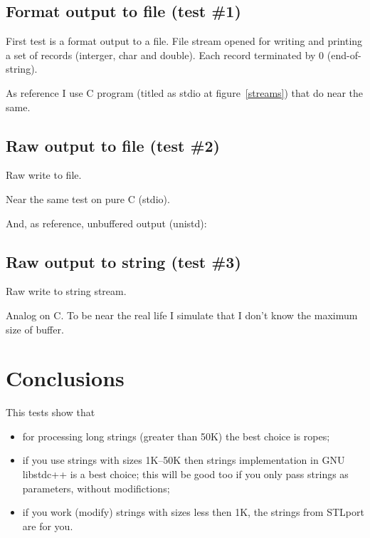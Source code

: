 \documentclass[a4paper]{article}
\providecommand{\STLport}{{\fontfamily{cmss}\selectfont STLport}}
\providecommand{\libstd}{{\fontfamily{cmtt}\selectfont GNU \mbox{libstdc++}}}
\begin{document}
\subsection{Format output to file\label{fstream-format} (test \#1)}

First test is a format output to a file. File stream opened for writing
and printing a set of records (interger, char and double). Each record
terminated by 0 (end-of-string).



As reference I use C program (titled as stdio at figure~\ref{streams}) that
do near the same.



\subsection{Raw output to file\label{fstream-raw} (test \#2)}

Raw write to file.



Near the same test on pure C (stdio).



And, as reference, unbuffered output (unistd):



\subsection{Raw output to string\label{sstream-raw} (test \#3)}

Raw write to string stream.



Analog on C. To be near the real life I simulate that I don't know
the maximum size of buffer.



\section{Conclusions}

This tests show that
\begin{itemize}
  \item for processing long strings (greater than 50K) the best choice is
        ropes;
  \item if you use strings with sizes 1K--50K then strings implementation in 
        \libstd{} is a best choice; this will be good too if you only pass
        strings as parameters, without modifictions;
  \item if you work (modify) strings with sizes less then 1K,
        the strings from \STLport{} are for you.
\end{itemize}
\end{document}
